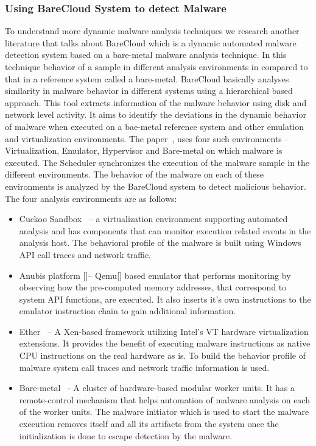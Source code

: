 \documentclass[11pt]{article}
\begin{document}
		\subsubsection{Using BareCloud System to detect Malware}
		To understand more dynamic malware analysis techniques we research another literature that talks about BareCloud which is a dynamic automated malware detection system based on a bare-metal malware analysis technique. In this technique behavior of a sample in different analysis environments in compared to that in a reference system called a bare-metal. BareCloud basically analyses similarity in malware behavior in different systems using a hierarchical based approach. This tool extracts information of the malware behavior using disk and network level activity. It aims to identify the deviations in the dynamic behavior of malware when executed on a bae-metal reference system and other emulation and virtualization environments. The paper~\cite{kirat2014barecloud}, uses four such environments – Virtualization, Emulator, Hypervisor and Bare-metal on which malware is executed. The Scheduler synchronizes the execution of the malware sample in the different environments. The behavior of the malware on each of these environments is analyzed by the BareCloud system to detect malicious behavior.
		The four analysis environments are as follows:
		\begin{itemize}
			\item Cuckoo Sandbox~\cite{willems2007toward} – a virtualization environment supporting automated analysis and has components that can monitor execution related events in the analysis host. The behavioral profile of the malware is built using Windows API call traces and network traffic.
			\item Anubis platform []– Qemu[] based emulator that performs monitoring by observing how the pre-computed memory addresses, that correspond to system API functions, are executed. It also inserts it’s own instructions to the emulator instruction chain to gain additional information.
			\item Ether~\cite{dinaburg2008ether} – A Xen-based framework utilizing Intel’s VT hardware virtualization extensions. It provides the benefit of executing malware instructions as native CPU instructions on the real hardware as is. To build the behavior profile of malware system call traces and network traffic information is used.
			\item Bare-metal~\cite{kirat2014barecloud} -  A cluster of hardware-based modular worker units. It has a remote-control mechanism that helps automation of malware analysis on each of the worker units. The malware initiator which is used to start the malware execution removes itself and all its artifacts from the system once the initialization is done to escape detection by the malware.
		\end{itemize}
\end{document}
